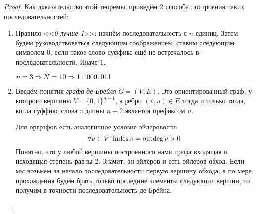 \begin{proof}
	Как доказательство этой теоремы, приведём 2 способа построения таких последовательностей:
	
	\begin{enumerate}
		\item Правило <<\textit{0 лучше 1}>>: начнём последовательность с $n$ единиц. Затем будем руководствоваться следующим соображением: ставим следующим символом $0$, если такое слово-суффикс ещё не встречалось в последовательности. Иначе $1$.
		
		\begin{example}
			\(n = 3 \Rightarrow N = 10 \Rightarrow 1110001011\)
		\end{example}
	
		\item Введём понятия \textit{графа де Брёйля} $G = (V, E)$. Это ориентированный граф, у которого вершины $V = \{0, 1\}^{n - 1}$, а ребро $(v, u) \in E$ тогда и только тогда, когда суффикс слова $v$ длины $n - 2$ является префиксом $u$.
		
		Для орграфов есть аналогичное условие эйлеровости:
		\[
			\forall v \in V\ \operatorname{indeg} v = \operatorname{outdeg} v > 0
		\]
		Понятно, что у любой вершины построенного нами графа входящая и исходящая степень равны 2. Значит, он эйлёров и есть эйлеров обход. Если мы возьмём за начало последовательности первую вершину обхода, а по мере прохождения будем брать только последние элементы следующих вершин, то получим в точности последовательность де Брёйна.
	\end{enumerate}
\end{proof}